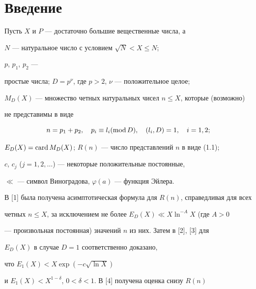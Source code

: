 

\maketitle


\label{begin}





\section{Введение}





Пусть $X$ и $P$ --- достаточно большие вещественные числа, а


$N$ --- натуральное число с условием $\sqrt{N}<X\le N$;


$p$, $p_1$, $p_2$ ---


простые числа; $D=p^{\nu}$, где $p>2$, $\nu$ --- положительное целое;


$M_D(X)$ --- множество четных натуральных чисел $n\le X$, которые (возможно)


не представимы в виде


\begin{equation}


n=p_1+p_2,\quad p_i\equiv l_i(\Mod D),\quad (l_i, D)=1,\quad i=1,2;


\end{equation}     


$E_D(X)=\operatorname{card} M_D(X)$; $R(n)$ --- число представлений $n$ в виде (1.1);


$c$, $c_j$ ($j=1,2,\dotsc$) --- некоторые положительные постоянные,


$\ll$ --- символ Виноградова, $\varphi (a)$ --- функция Эйлера.





В [1] была получена асимптотическая формула для $R(n)$, справедливая для всех


четных $n\le X$, за исключением не более $E_D(X)\ll X\ln^{-A}X$ (где $A>0$


--- произвольная постоянная) значений $n$ из них. Затем в [2], [3] для


$E_D(X)$ в случае $D=1$ соответственно доказано,


что $E_1(X)<X\exp(-c\sqrt{\ln X})$


и $E_1(X)<X^{1-\delta}$, $0<\delta<1$. В [4] получена оценка снизу $R(n)$



